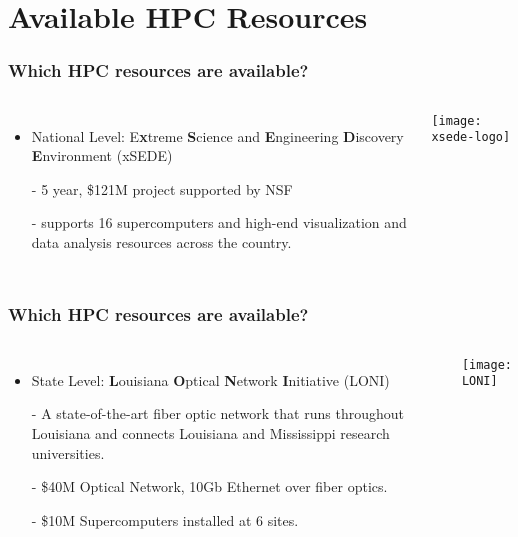 \documentclass[slidestop,mathserif,compress,xcolor=svgnames,table]{beamer}
\begin{document}
\section{Available HPC Resources}
\begin{frame}
  \frametitle{\small Which HPC resources are available?}
  \begin{columns}
    \begin{itemize}
      \item National Level: E\textbf{x}treme \textbf{S}cience and \textbf{E}ngineering \textbf{D}iscovery \textbf{E}nvironment (xSEDE)
      \item[-] 5 year, \$121M project supported by NSF
      \item[-] supports 16 supercomputers and high-end visualization and data analysis resources across the country.
    \end{itemize}
    \begin{center}
      \texttt{[image: xsede-logo]}
    \end{center}
  \end{columns}
\end{frame}
\begin{frame}
  \frametitle{\small Which HPC resources are available?}
  \begin{columns}
    \begin{itemize}
      \item State Level: \textbf{L}ouisiana \textbf{O}ptical \textbf{N}etwork \textbf{I}nitiative (LONI)
      \item[-] A state-of-the-art fiber optic network that runs throughout Louisiana and connects Louisiana and Mississippi research universities.
      \item[-] \$40M Optical Network, 10Gb Ethernet over fiber optics.
      \item[-] \$10M Supercomputers installed at 6 sites.
    \end{itemize}
    \begin{center}
      \texttt{[image: LONI]}
    \end{center}
  \end{columns}
\end{frame}
\end{document}
